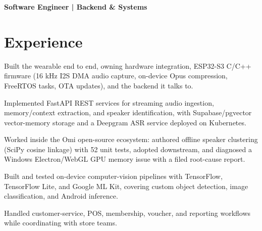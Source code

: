 \documentclass{../../../templates/v3/resume-openfont}
\begin{document}

{\small\bfseries Software Engineer | Backend \& Systems}\par\vspace{2pt}

\section{Experience}
\begin{resumeitemize}
\item Built the wearable end to end, owning hardware integration, ESP32-S3 C/C++ firmware (16 kHz I2S DMA audio capture, on-device Opus compression, FreeRTOS tasks, OTA updates), and the backend it talks to.
\item Implemented FastAPI REST services for streaming audio ingestion, memory/context extraction, and speaker identification, with Supabase/pgvector vector-memory storage and a Deepgram ASR service deployed on Kubernetes.
\item Worked inside the Omi open-source ecosystem: authored offline speaker clustering (SciPy cosine linkage) with 52 unit tests, adopted downstream, and diagnosed a Windows Electron/WebGL GPU memory issue with a filed root-cause report.
\end{resumeitemize}

\begin{resumeitemize}
\item Built and tested on-device computer-vision pipelines with TensorFlow, TensorFlow Lite, and Google ML Kit, covering custom object detection, image classification, and Android inference.
\end{resumeitemize}

\begin{resumeitemize}
\item Handled customer-service, POS, membership, voucher, and reporting workflows while coordinating with store teams.
\end{resumeitemize}
\end{document}
